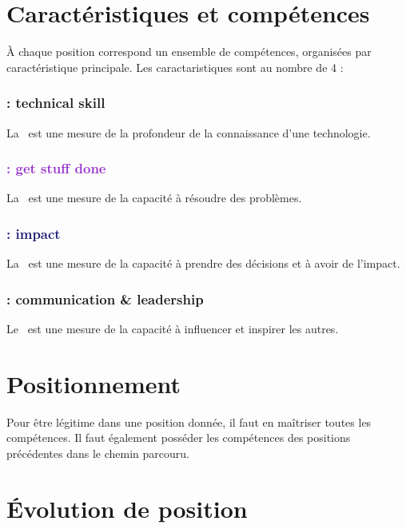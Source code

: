 \documentclass[a4paper, french, openany, 12pt]{book}
\newcommand\dexterity{\textcolor{BrickRed}{\bsc{Dexterity}}}
\newcommand\strength{\textcolor{DarkOrchid}{\bsc{Strength}}}
\newcommand\wisdom{\textcolor{MidnightBlue}{\bsc{Wisdom}}}
\newcommand\charisma{\textcolor{OliveGreen}{\bsc{Charisma}}}
\begin{document}
\begin{multicols}{2}
  \section*{Caractéristiques et compétences}
  
  À chaque position correspond un ensemble de compétences, organisées par caractéristique principale.
  Les caractaristiques sont au nombre de 4 :
  
  \subsubsection*{\textcolor{BrickRed}{\textbf{ : technical skill}}} 
  
  La \dexterity\ est une mesure de la profondeur de la connaissance d'une technologie.
  
  \subsubsection*{\textcolor{DarkOrchid}{\textbf{ : get stuff done}}} 
  
  La \strength\ est une mesure de la capacité à résoudre des problèmes.
  
  \subsubsection*{\textcolor{MidnightBlue}{\textbf{ : impact}}} 
  
  La \wisdom\ est une mesure de la capacité à prendre des décisions et à avoir de l'impact.
  
  \subsubsection*{\textcolor{OliveGreen}{\textbf{ : communication \& leadership}}} 
  
  Le \charisma\ est une mesure de la capacité à influencer et inspirer les autres.
  
  \section*{Positionnement}
  
  Pour être légitime dans une position donnée, il faut en maîtriser toutes les compétences.
  Il faut également posséder les compétences des positions précédentes dans le chemin parcouru.
  
  \section*{Évolution de position}
  

\end{multicols}
\end{document}
